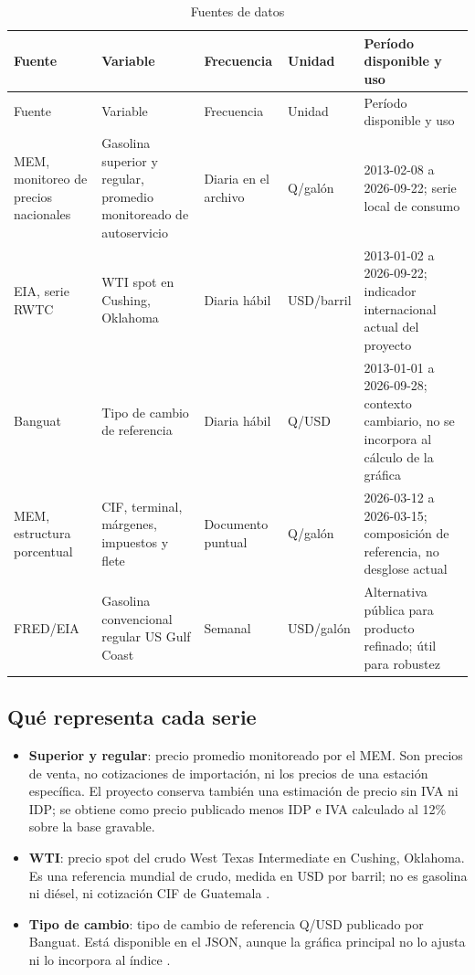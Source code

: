 \documentclass[11pt,letterpaper]{article}
\begin{document}
\begin{longtable}{p{}p{}p{}p{}p{}}
\caption{Fuentes de datos}\label{tab:fuentes}\\
\toprule
Fuente & Variable & Frecuencia & Unidad & Período disponible y uso \\
\midrule
\endfirsthead
\toprule
Fuente & Variable & Frecuencia & Unidad & Período disponible y uso \\
\midrule
\endhead
MEM, monitoreo de precios nacionales & Gasolina superior y regular, promedio monitoreado de autoservicio & Diaria en el archivo & Q/galón & 2013-02-08 a 2026-09-22; serie local de consumo \parencite{memPrecios2026} \\
EIA, serie RWTC & WTI spot en Cushing, Oklahoma & Diaria hábil & USD/barril & 2013-01-02 a 2026-09-22; indicador internacional actual del proyecto \parencite{eiaApi2026} \\
Banguat & Tipo de cambio de referencia & Diaria hábil & Q/USD & 2013-01-01 a 2026-09-28; contexto cambiario, no se incorpora al cálculo de la gráfica \parencite{banguatTipoCambio2026} \\
MEM, estructura porcentual & CIF, terminal, márgenes, impuestos y flete & Documento puntual & Q/galón & 2026-03-12 a 2026-03-15; composición de referencia, no desglose actual \parencite{memEstructura2026} \\
FRED/EIA & Gasolina convencional regular US Gulf Coast & Semanal & USD/galón & Alternativa pública para producto refinado; útil para robustez \parencite{fredGasolinaGulf2026} \\
\bottomrule
\end{longtable}

\subsection{Qué representa cada serie}
\begin{itemize}
  \item \textbf{Superior y regular}: precio promedio monitoreado por el MEM. Son precios de venta, no cotizaciones de importación, ni los precios de una estación específica. El proyecto conserva también una estimación de precio sin IVA ni IDP; se obtiene como precio publicado menos IDP e IVA calculado al 12\% sobre la base gravable.
  \item \textbf{WTI}: precio spot del crudo West Texas Intermediate en Cushing, Oklahoma. Es una referencia mundial de crudo, medida en USD por barril; no es gasolina ni diésel, ni cotización CIF de Guatemala \parencite{eiaApi2026}.
  \item \textbf{Tipo de cambio}: tipo de cambio de referencia Q/USD publicado por Banguat. Está disponible en el JSON, aunque la gráfica principal no lo ajusta ni lo incorpora al índice \parencite{banguatTipoCambio2026}.
\end{itemize}
\end{document}
